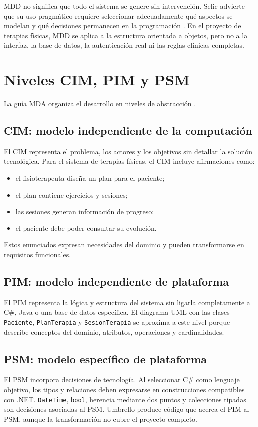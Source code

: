 MDD no significa que todo el sistema se genere sin intervención. Selic advierte que su uso pragmático requiere seleccionar adecuadamente qué aspectos se modelan y qué decisiones permanecen en la programación \cite{Selic2003}. En el proyecto de terapias físicas, MDD se aplica a la estructura orientada a objetos, pero no a la interfaz, la base de datos, la autenticación real ni las reglas clínicas completas.

\section{Niveles CIM, PIM y PSM}
La guía MDA organiza el desarrollo en niveles de abstracción \cite{OMG2014MDA}.

\subsection{CIM: modelo independiente de la computación}
El CIM representa el problema, los actores y los objetivos sin detallar la solución tecnológica. Para el sistema de terapias físicas, el CIM incluye afirmaciones como:
\begin{itemize}
  \item el fisioterapeuta diseña un plan para el paciente;
  \item el plan contiene ejercicios y sesiones;
  \item las sesiones generan información de progreso;
  \item el paciente debe poder consultar su evolución.
\end{itemize}

Estos enunciados expresan necesidades del dominio y pueden transformarse en requisitos funcionales.

\subsection{PIM: modelo independiente de plataforma}
El PIM representa la lógica y estructura del sistema sin ligarla completamente a C\#, Java o una base de datos específica. El diagrama UML con las clases \texttt{Paciente}, \texttt{PlanTerapia} y \texttt{SesionTerapia} se aproxima a este nivel porque describe conceptos del dominio, atributos, operaciones y cardinalidades.

\subsection{PSM: modelo específico de plataforma}
El PSM incorpora decisiones de tecnología. Al seleccionar C\# como lenguaje objetivo, los tipos y relaciones deben expresarse en construcciones compatibles con .NET. \texttt{DateTime}, \texttt{bool}, herencia mediante dos puntos y colecciones tipadas son decisiones asociadas al PSM. Umbrello produce código que acerca el PIM al PSM, aunque la transformación no cubre el proyecto completo.

